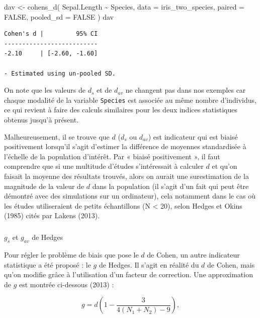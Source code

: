 \documentclass[
  letterpaper,
]{book}
\makeatletter
\let\oldsubparagraph\subparagraph
\renewcommand{\subparagraph}{
    \@ifstar
      \xxxSubParagraphStar
      \xxxSubParagraphNoStar
  }
\newcommand{\xxxSubParagraphStar}[1]{\oldsubparagraph*{#1}\mbox{}}
\newcommand{\xxxSubParagraphNoStar}[1]{\oldsubparagraph{#1}\mbox{}}
\newenvironment{Shaded}{\begin{snugshade}}{\end{snugshade}}
\newcommand{\AttributeTok}[1]{\textcolor[rgb]{0.40,0.45,0.13}{#1}}
\newcommand{\ConstantTok}[1]{\textcolor[rgb]{0.56,0.35,0.01}{#1}}
\newcommand{\FunctionTok}[1]{\textcolor[rgb]{0.28,0.35,0.67}{#1}}
\newcommand{\NormalTok}[1]{\textcolor[rgb]{0.00,0.23,0.31}{#1}}
\newcommand{\OtherTok}[1]{\textcolor[rgb]{0.00,0.23,0.31}{#1}}
\newcommand{\SpecialCharTok}[1]{\textcolor[rgb]{0.37,0.37,0.37}{#1}}
\makeatother
\begin{document}
\begin{Shaded}
\begin{Highlighting}[]
\NormalTok{dav }\OtherTok{\textless{}{-}}
  \FunctionTok{cohens\_d}\NormalTok{(}
\NormalTok{    Sepal.Length }\SpecialCharTok{\textasciitilde{}}\NormalTok{ Species,}
    \AttributeTok{data =}\NormalTok{ iris\_two\_species,}
    \AttributeTok{paired =} \ConstantTok{FALSE}\NormalTok{,}
    \AttributeTok{pooled\_sd =} \ConstantTok{FALSE}
\NormalTok{  )}
\NormalTok{dav}
\end{Highlighting}
\end{Shaded}

\begin{verbatim}
Cohen's d |         95% CI
--------------------------
-2.10     | [-2.60, -1.60]

- Estimated using un-pooled SD.
\end{verbatim}

On note que les valeurs de \(d_s\) et de \(d_{av}\) ne changent pas dans
nos exemples car chaque modalité de la variable \texttt{Species} est
associée au même nombre d'individus, ce qui revient à faire des calculs
similaires pour les deux indices statistiques obtenus jusqu'à présent.

Malheureusement, il se trouve que \(d\) (\(d_s\) ou \(d_{av}\)) est
indicateur qui est biaisé positivement lorsqu'il s'agit d'estimer la
différence de moyennes standardisée à l'échelle de la population
d'intérêt. Par « biaisé positivement », il faut comprendre que si une
multitude d'études s'intéressait à calculer \(d\) et qu'on faisait la
moyenne des résultats trouvés, alors on aurait une surestimation de la
magnitude de la valeur de \(d\) dans la population (il s'agit d'un fait
qui peut être démontré avec des simulations sur un ordinateur), cela
notamment dans le cas où les études utiliseraient de petits échantillons
(N \textless{} 20), selon Hedges et Okins (1985) cités par Lakens
(2013).

\subparagraph{\texorpdfstring{\(g_{s}\) et \(g_{av}\) de
Hedges}{g\_\{s\} et g\_\{av\} de Hedges}}\label{g_s-et-g_av-de-hedges}

Pour régler le problème de biais que pose le \(d\) de Cohen, un autre
indicateur statistique a été proposé : le \(g\) de Hedges. Il s'agit en
réalité du \(d\) de Cohen, mais qu'on modifie grâce à l'utilisation d'un
facteur de correction. Une approximation de \(g\) est montrée ci-dessous
(2013) :

\[g = d (1 - \frac{3}{4(N_{1} + N_{2}) - 9}),\]
\end{document}
